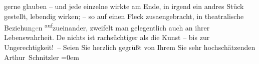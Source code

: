                     gerne glauben – und jede einzelne wirkte am Ende, in irgend ein andres Stück
                    gestellt, lebendig wirken; – so auf einen Fleck zusa{\geminationm}engebracht, in theatralische Beziehun\textcolor{gray}{ge}n \substVorne{}\textsuperscript{auf}\substDazwischen{}zu\substHinten{}einander, zweifelt man gelegentlich auch an ihrer Lebenswahrheit. De{\geminationn} nichts ist rachsüchtiger als die Kunst – bis zur
                    Ungerechtigkeit! –\pend
           \pstart
           Seien Sie herzlich gegrüßt von Ihrem Sie sehr hochschätzenden{\\[\baselineskip]}\spacefill\mbox{Arthur Schnitzler}\pend
           \leftskip=0em{}\endnumbering{}  
      